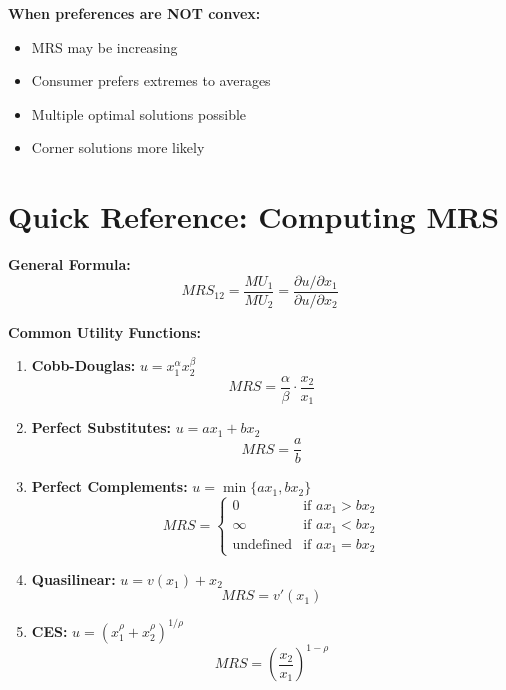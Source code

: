 \documentclass[11pt,a4paper]{article}
\begin{document}
\textbf{When preferences are NOT convex:}
\begin{itemize}
\item MRS may be increasing
\item Consumer prefers extremes to averages
\item Multiple optimal solutions possible
\item Corner solutions more likely
\end{itemize}

\section{Quick Reference: Computing MRS}

\textbf{General Formula:}
\[
\boxed{MRS_{12} = \frac{MU_1}{MU_2} = \frac{\partial u/\partial x_1}{\partial u/\partial x_2}}
\]

\textbf{Common Utility Functions:}

\begin{enumerate}
\item \textbf{Cobb-Douglas:} $u = x_1^\alpha x_2^\beta$
\[
MRS = \frac{\alpha}{\beta}\cdot\frac{x_2}{x_1}
\]

\item \textbf{Perfect Substitutes:} $u = ax_1 + bx_2$
\[
MRS = \frac{a}{b}
\]

\item \textbf{Perfect Complements:} $u = \min\{ax_1, bx_2\}$
\[
MRS = \begin{cases} 0 & \text{if } ax_1 > bx_2\\ \infty & \text{if } ax_1 < bx_2\\ \text{undefined} & \text{if } ax_1 = bx_2 \end{cases}
\]

\item \textbf{Quasilinear:} $u = v(x_1) + x_2$
\[
MRS = v'(x_1)
\]

\item \textbf{CES:} $u = (x_1^\rho + x_2^\rho)^{1/\rho}$
\[
MRS = \left(\frac{x_2}{x_1}\right)^{1-\rho}
\]
\end{enumerate}
\end{document}
